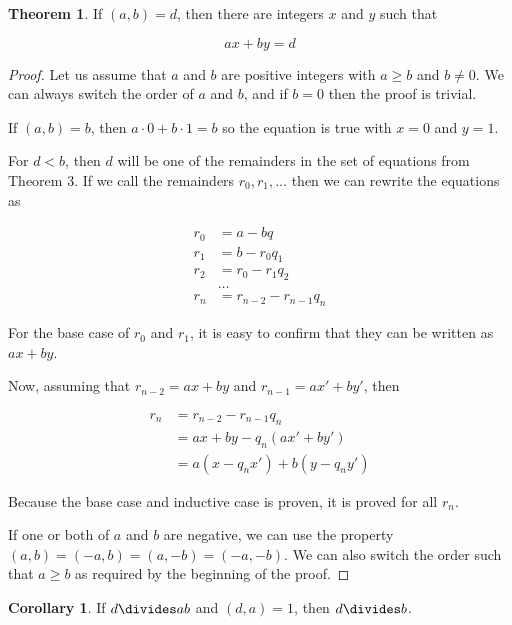 \documentclass{article}
\theoremstyle{definition} %
\newtheorem{theorem}{Theorem}[section] %
\theoremstyle{definition}
\newtheorem{corollary}{Corollary}[theorem] %
\theoremstyle{definition}
\theoremstyle{definition}
\begin{document}
  \begin{theorem}
    If $(a, b) = d$, then there are integers $x$ and $y$ such that
    
    \begin{equation*}
      ax + by = d
    \end{equation*}
  \end{theorem}
  
  \begin{proof}
    Let us assume that $a$ and $b$ are positive integers with $a \geq b$ and $b \neq 0$.
    We can always switch the order of $a$ and $b$, and if $b = 0$ then the proof is trivial.
    
    If $(a, b) = b$, then $a \cdot 0 + b \cdot 1 = b$ so the equation is true with $x = 0$ and $y = 1$.
    
    For $d < b$, then $d$ will be one of the remainders in the set of equations from Theorem 3.
    If we call the remainders $r_0, r_1, \dots$ then we can rewrite the equations as
    
    \begin{align*}
      r_0 &= a - bq \\
      r_1 &= b - r_0q_1 \\
      r_2 &= r_0 - r_1q_2 \\
      &\dots \\
      r_n &= r_{n-2} - r_{n-1}q_n
    \end{align*}
    
    For the base case of $r_0$ and $r_1$, it is easy to confirm that they can be written as
    $ax + by$.
    
    Now, assuming that $r_{n-2} = ax + by$ and $r_{n-1} = ax' + by'$, then
    
    \begin{align*}
      r_n &= r_{n-2} - r_{n-1}q_n \\
      &= ax + by - q_n(ax' + by') \\
      &= a(x - q_nx') + b(y - q_ny')
    \end{align*}
    
    Because the base case and inductive case is proven, it is proved for all $r_n$.
    
    If one or both of $a$ and $b$ are negative, we can use the property $(a, b) = (-a, b) = (a, -b) = (-a, -b)$.
    We can also switch the order such that $a \geq b$ as required by the beginning of the proof.
  \end{proof}
  
  \begin{corollary}
    If $d \divides ab$ and $(d, a) = 1$, then $d \divides b$.
  \end{corollary}
  
\end{document}
